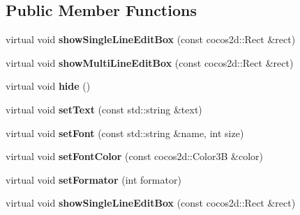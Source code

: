 \subsection*{Public Member Functions}
\begin{DoxyCompactItemize}
\item 
\mbox{\label{classPlayerEditBoxServiceMac_a2fb4ad890259ee678b58997f22c7a292}} 
virtual void {\bfseries show\+Single\+Line\+Edit\+Box} (const cocos2d\+::\+Rect \&rect)
\item 
\mbox{\label{classPlayerEditBoxServiceMac_a90886ddf093b1c7e8c34154f946f5d4a}} 
virtual void {\bfseries show\+Multi\+Line\+Edit\+Box} (const cocos2d\+::\+Rect \&rect)
\item 
\mbox{\label{classPlayerEditBoxServiceMac_a6d66d8e6ac93b5e9cc429aa52077618a}} 
virtual void {\bfseries hide} ()
\item 
\mbox{\label{classPlayerEditBoxServiceMac_a8bb585a69aeec43b73db908528bb7bdb}} 
virtual void {\bfseries set\+Text} (const std\+::string \&text)
\item 
\mbox{\label{classPlayerEditBoxServiceMac_afa8920087f8b2be2b0682bc6b39eb90d}} 
virtual void {\bfseries set\+Font} (const std\+::string \&name, int size)
\item 
\mbox{\label{classPlayerEditBoxServiceMac_acabdf2b531ceaf0e98b92315a2cef8db}} 
virtual void {\bfseries set\+Font\+Color} (const cocos2d\+::\+Color3B \&color)
\item 
\mbox{\label{classPlayerEditBoxServiceMac_af6228fdb38d70a7a01050f4785b65bb5}} 
virtual void {\bfseries set\+Formator} (int formator)
\item 
\mbox{\label{classPlayerEditBoxServiceMac_a54e455be97c6aa0910c35848c811d16b}} 
virtual void {\bfseries show\+Single\+Line\+Edit\+Box} (const cocos2d\+::\+Rect \&rect)
\item 
\mbox{\label{classPlayerEditBoxServiceMac_aa44019fbc992cabb4ba1419975abf5a9}} 

\end{DoxyCompactItemize}
